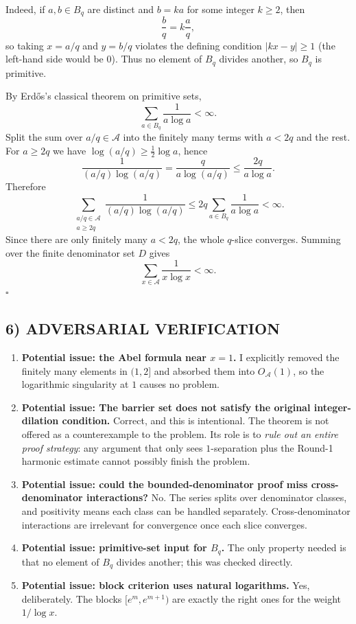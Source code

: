 Indeed, if $a,b\in B_q$ are distinct and $b=ka$ for some integer $k\ge 2$, then
\[
\frac{b}{q}=k\frac{a}{q},
\]
so taking $x=a/q$ and $y=b/q$ violates the defining condition $|kx-y|\ge 1$ (the left-hand side
would be $0$). Thus no element of $B_q$ divides another, so $B_q$ is primitive.

By Erd\H{o}s's classical theorem on primitive sets,
\[
\sum_{a\in B_q}\frac{1}{a\log a}<\infty.
\]
Split the sum over $a/q\in\mathcal A$ into the finitely many terms with $a<2q$ and the rest.
For $a\ge 2q$ we have $\log(a/q)\ge \frac12\log a$, hence
\[
\frac{1}{(a/q)\log(a/q)}
=
\frac{q}{a\log(a/q)}
\le
\frac{2q}{a\log a}.
\]
Therefore
\[
\sum_{\substack{a/q\in\mathcal A\\ a\ge 2q}}
\frac{1}{(a/q)\log(a/q)}
\le
2q\sum_{a\in B_q}\frac{1}{a\log a}
<
\infty.
\]
Since there are only finitely many $a<2q$, the whole $q$-slice converges. Summing over the
finite denominator set $D$ gives
\[
\sum_{x\in\mathcal A}\frac{1}{x\log x}<\infty.
\]
\hfill $\square$

\subsection*{6) ADVERSARIAL VERIFICATION}

\begin{enumerate}
\item \textbf{Potential issue: the Abel formula near $x=1$.}
I explicitly removed the finitely many elements in $(1,2]$ and absorbed them into $O_{\mathcal A}(1)$,
so the logarithmic singularity at $1$ causes no problem.
\item \textbf{Potential issue: The barrier set does not satisfy the original integer-dilation condition.}
Correct, and this is intentional. The theorem is not offered as a counterexample to the problem.
Its role is to \emph{rule out an entire proof strategy}: any argument that only sees
$1$-separation plus the Round-1 harmonic estimate cannot possibly finish the problem.
\item \textbf{Potential issue: could the bounded-denominator proof miss cross-denominator interactions?}
No. The series splits over denominator classes, and positivity means each class can be handled separately.
Cross-denominator interactions are irrelevant for convergence once each slice converges.
\item \textbf{Potential issue: primitive-set input for $B_q$.}
The only property needed is that no element of $B_q$ divides another; this was checked directly.
\item \textbf{Potential issue: block criterion uses natural logarithms.}
Yes, deliberately. The blocks $[e^m,e^{m+1})$ are exactly the right ones for the weight $1/\log x$.
\end{enumerate}

